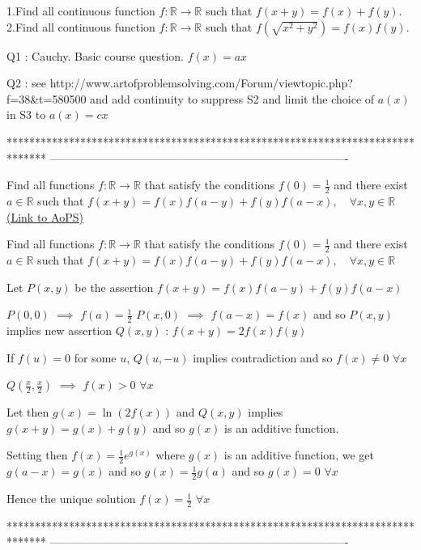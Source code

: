 \begin{solution}
	\begin{tcolorbox}1.Find all continuous function $f: \mathbb{R}\to\mathbb{R}$ such that $f(x+y)=f(x)+f(y)$.
2.Find all continuous function $f: \mathbb{R}\to\mathbb{R}$ such that $f(\sqrt{x^2+y^2})=f(x)f(y)$.\end{tcolorbox}
Q1 : Cauchy. Basic course question. $f(x)=ax$

Q2 : see http://www.artofproblemsolving.com/Forum/viewtopic.php?f=38&t=580500 and add continuity to suppress S2 and limit the choice of $a(x)$ in S3 to $a(x)=cx$
\end{solution}
*******************************************************************************
-------------------------------------------------------------------------------

\begin{problem}
	Find all functions  $ f:\mathbb{R}\to\mathbb{R} $  that satisfy the conditions
$ f(0)=\frac{1}{2} $ and  there exist $ a\in\mathbb{R} $ such that $ f(x+y) = f(x)f(a-y) + f(y)f(a-x),
 \quad\forall x,y\in\mathbb{R} $
	\flushright \href{https://artofproblemsolving.com/community/c6h580813}{(Link to AoPS)}
\end{problem}



\begin{solution}
	\begin{tcolorbox}Find all functions  $ f:\mathbb{R}\to\mathbb{R} $  that satisfy the conditions
$ f(0)=\frac{1}{2} $ and  there exist $ a\in\mathbb{R} $ such that $ f(x+y) = f(x)f(a-y) + f(y)f(a-x),
 \quad\forall x,y\in\mathbb{R} $\end{tcolorbox}
Let $P(x,y)$ be the assertion $f(x+y)=f(x)f(a-y)+f(y)f(a-x)$

$P(0,0)$ $\implies$ $f(a)=\frac 12$
$P(x,0)$ $\implies$ $f(a-x)=f(x)$ and so $P(x,y)$ implies new assertion $Q(x,y)$ : $f(x+y)=2f(x)f(y)$

If $f(u)=0$ for some $u$, $Q(u,-u)$ implies contradiction and so $f(x)\ne 0$ $\forall x$

$Q(\frac x2,\frac x2)$ $\implies$ $f(x)>0$ $\forall x$

Let then $g(x)=\ln (2f(x))$ and $Q(x,y)$ implies $g(x+y)=g(x)+g(y)$ and so $g(x)$ is an additive function.

Setting then $f(x)=\frac 12 e^{g(x)}$ where $g(x)$ is an additive function, we get $g(a-x)=g(x)$ and so $g(x)=\frac 12g(a)$ and so $g(x)=0$ $\forall x$

Hence the unique solution $\boxed{f(x)=\frac 12}$ $\forall x$
\end{solution}
*******************************************************************************
-------------------------------------------------------------------------------

